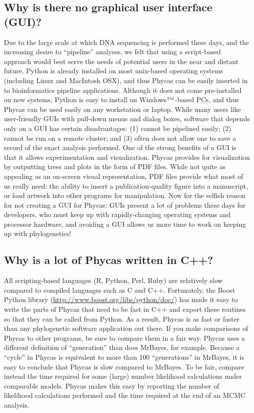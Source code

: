 \documentclass[10pt]{article}
\newcommand{\trademark}[1]{#1${}^{\mbox{\tiny TM}}$}
\begin{document}
\subsection{Why is there no graphical user interface (GUI)?}
Due to the large scale at which DNA sequencing is performed these days, and the increasing desire to ``pipeline'' analyses, we felt that using a script-based approach would best serve the needs of potential users in the near and distant future. Python is already installed on most unix-based operating systems (including Linux and MacIntosh OSX), and thus Phycas can be easily inserted in to bioinformatics pipeline applications. Although it does not come pre-installed on new systems, Python is easy to install on \trademark{Windows}-based PCs, and thus Phycas can be used easily on any workstation or laptop. While many users like user-friendly GUIs with pull-down menus and dialog boxes, software that depends only on a GUI has certain disadvantages: (1) cannot be pipelined easily; (2) cannot be run on a remote cluster; and (3) often does not allow one to save a record of the exact analysis performed. One of the strong benefits of a GUI is that it allows experimentation and visualization. Phycas provides for visualization by outputting trees and plots in the form of PDF files. While not quite as appealing as an on-screen visual representation, PDF files provide what most of us really need: the ability to insert a publication-quality figure into a manuscript, or load artwork into other programs for manipulation. Now for the selfish reason for not creating a GUI for Phycas: GUIs present a lot of problems these days for developers, who must keep up with rapidly-changing operating systems and processor hardware, and avoiding a GUI allows us more time to work on keeping up with phylogenetics! 

\subsection{Why is a lot of Phycas written in C++?}
All scripting-based languages (R, Python, Perl, Ruby) are relatively slow compared to compiled languages such as C and C++. Fortunately, the Boost Python library (\url{http://www.boost.org/libs/python/doc/}) has made it easy to write the parts of Phycas that need to be fast in C++ and export these routines so that they can be called from Python. As a result, Phycas is as fast or faster than any phylogenetic software application out there. If you make comparisons of Phycas to other programs, be sure to compare them in a fair way. Phycas uses a different definition of ``generation'' than does MrBayes, for example. Because a ``cycle'' in Phycas is equivalent to more than 100 ``generations'' in MrBayes, it is easy to conclude that Phycas is slow compared to MrBayes. To be fair, compare instead the time required for some (large) number likelihood calculations under comparable models. Phycas makes this easy by reporting the number of likelihood calculations performed and the time required at the end of an MCMC analysis.
\end{document}

